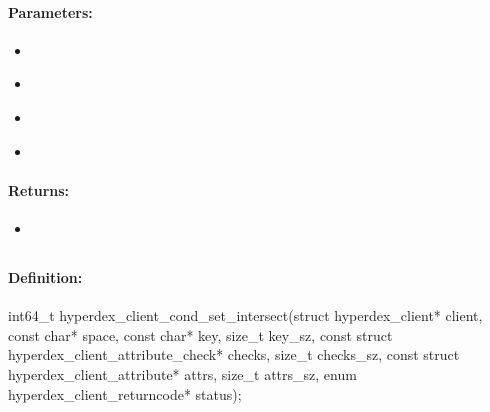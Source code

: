 \paragraph{Parameters:}
\begin{itemize}[noitemsep]
\item {}\\

\item {}\\

\item {}\\

\item {}\\

\end{itemize}

\paragraph{Returns:}
\begin{itemize}[noitemsep]
\item {}\\

\end{itemize}

\pagebreak
\subsection{}
\label{api:c:cond_set_intersect}


\paragraph{Definition:}
\begin{ccode}
int64_t hyperdex_client_cond_set_intersect(struct hyperdex_client* client,
        const char* space,
        const char* key, size_t key_sz,
        const struct hyperdex_client_attribute_check* checks, size_t checks_sz,
        const struct hyperdex_client_attribute* attrs, size_t attrs_sz,
        enum hyperdex_client_returncode* status);
\end{ccode}

